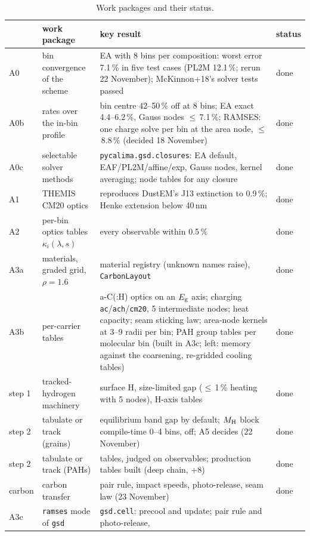 \documentclass[11pt,a4paper]{article}
\newcommand{\MH}{M_{\rm H}}
\newcommand{\Eg}{E_{\rm g}}
\newcommand{\ok}{\textcolor{green!45!black}{done}}
\begin{document}
\begin{table}[H]
\centering\small
\caption{Work packages and their status.}\label{tab:status}
\begin{tabularx}{\textwidth}{@{}l l L l@{}}
\toprule
& work package & key result & status \\
\midrule
A0 & bin convergence of the scheme & EA with 8 bins per composition: worst error 7.1\,\% in five test cases (PL2M
      12.1\,\%; rerun 22 November); McKinnon+18's solver tests passed & \ok \\
A0b & rates over the in-bin profile & bin centre 42--50\,\% off at 8 bins; EA exact 4.4--6.2\,\%, Gauss nodes $\le$\,7.1\,\%;
      RAMSES: one charge solve per bin at the area node, $\le$\,8.8\,\% (decided 18 November) & \ok \\
A0c & selectable solver methods & \texttt{pycalima.gsd.closures}: EA default, EAF/PL2M/affine/exp, Gauss nodes, kernel
      averaging; node tables for any closure & \ok \\
A1 & THEMIS CM20 optics & reproduces DustEM's J13 extinction to 0.9\,\%; Henke extension below 40\,nm & \ok \\
A2 & per-bin optics tables $\kappa_i(\lambda,s)$ & every observable within 0.5\,\% & \ok \\
A3a & materials, graded grid, $\rho = 1.6$ & material registry (unknown names raise), \texttt{CarbonLayout} & \ok \\
A3b & per-carrier tables & a-C(:H) optics on an $\Eg$ axis; charging \texttt{ac}/\texttt{ach}/\texttt{cm20}, 5 intermediate nodes;
      heat capacity; seam sticking law; area-node kernels at 3--9 radii per bin; PAH group tables per molecular bin
      (built in A3c; left: memory against the coarsening, re-gridded cooling tables) & \ok \\
step 1 & tracked-hydrogen machinery & surface H, size-limited gap ($\le$\,1\,\% heating with 5 nodes), H-axis tables & \ok \\
step 2 & tabulate or track (grains) & equilibrium band gap by default; $\MH$ block compile-time 0--4 bins, off;
      A5 decides (22 November) & \ok \\
step 2 & tabulate or track (PAHs) & tables, judged on observables; production tables built (deep chain, +8) & \ok \\
carbon & carbon transfer & pair rule, impact speeds, photo-release, seam law (23 November) & \ok \\
A3c & \texttt{ramses} mode of \texttt{gsd} & \texttt{gsd.cell}: precool and update; pair rule and photo-release,

\end{tabularx}
\end{table}
\end{document}
